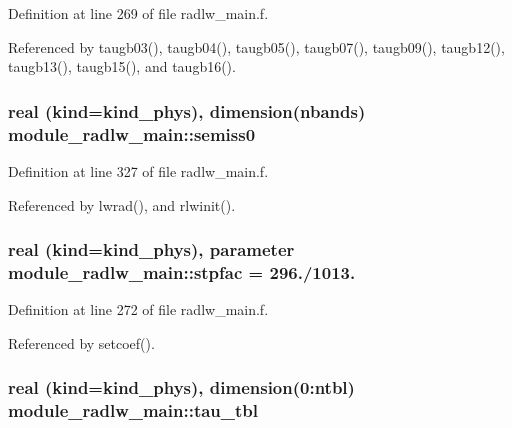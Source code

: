Definition at line 269 of file radlw\+\_\+main.\+f.



Referenced by taugb03(), taugb04(), taugb05(), taugb07(), taugb09(), taugb12(), taugb13(), taugb15(), and taugb16().

\subsubsection[{\texorpdfstring{semiss0}{semiss0}}]{\setlength{\rightskip}{0pt plus 5cm}real (kind=kind\+\_\+phys), dimension(nbands) module\+\_\+radlw\+\_\+main\+::semiss0\hspace{0.3cm}{\ttfamily [private]}}\hypertarget{namespacemodule__radlw__main_ae3b32aa685e5f07a0003c5e919d22996}{}\label{namespacemodule__radlw__main_ae3b32aa685e5f07a0003c5e919d22996}


Definition at line 327 of file radlw\+\_\+main.\+f.



Referenced by lwrad(), and rlwinit().

\subsubsection[{\texorpdfstring{stpfac}{stpfac}}]{\setlength{\rightskip}{0pt plus 5cm}real (kind=kind\+\_\+phys), parameter module\+\_\+radlw\+\_\+main\+::stpfac = 296./1013.\hspace{0.3cm}{\ttfamily [private]}}\hypertarget{namespacemodule__radlw__main_a483b88df2bdada7ef349d9530f91b762}{}\label{namespacemodule__radlw__main_a483b88df2bdada7ef349d9530f91b762}


Definition at line 272 of file radlw\+\_\+main.\+f.



Referenced by setcoef().

\subsubsection[{\texorpdfstring{tau\+\_\+tbl}{tau_tbl}}]{\setlength{\rightskip}{0pt plus 5cm}real (kind=kind\+\_\+phys), dimension(0\+:ntbl) module\+\_\+radlw\+\_\+main\+::tau\+\_\+tbl\hspace{0.3cm}{\ttfamily [private]}}\hypertarget{namespacemodule__radlw__main_a9f73814ee0b1840d8c546ef341645f43}{}\label{namespacemodule__radlw__main_a9f73814ee0b1840d8c546ef341645f43}



